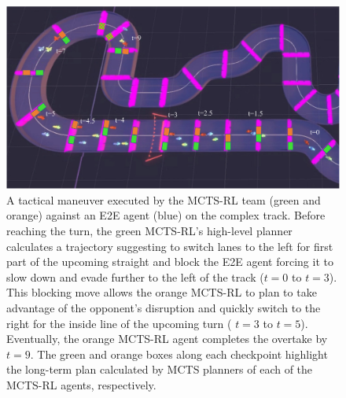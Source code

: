 \begin{figure}
 \centering
  \includegraphics[width=\textwidth]{Figures/MCTSRLTeamBlockToOvertake.pdf}
  \caption[Block to overtake maneuver executed by team of MCTS-RL agents.]{A tactical maneuver executed by the MCTS-RL team (green and orange) against an E2E agent (blue) on the complex track.  Before reaching the turn, the green MCTS-RL's high-level planner calculates a trajectory suggesting to switch lanes to the left for first part of the upcoming straight and block the E2E agent forcing it to slow down and evade further to the left of the track ($t=0$ to $t=3$). This blocking move allows the orange MCTS-RL to plan to take advantage of the opponent's disruption and quickly switch to the right for the inside line of the upcoming turn ( $t=3$ to $t=5$). Eventually, the orange MCTS-RL agent completes the overtake by $t=9$. The green and orange boxes along each checkpoint highlight the long-term plan calculated by MCTS planners of each of the MCTS-RL agents, respectively.}
  \label{fig:team_mctsrl:strategy}
\end{figure}